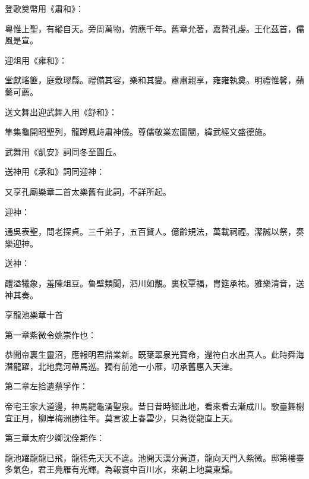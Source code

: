 \begin{pinyinscope}
 登歌奠幣用《肅和》：



 粵惟上聖，有縱自天。旁周萬物，俯應千年。舊章允著，嘉贄孔虔。王化茲首，儒風是宣。



 迎俎用《雍和》：



 堂獻瑤篚，庭敷璆縣。禮備其容，樂和其變。肅肅親享，雍雍執奠。明禮惟馨，蘋蘩可薦。



 送文舞出迎武舞入用《舒和》：



 隼集龜開昭聖列，龍蹲鳳歭肅神儀。尊儒敬業宏圖闡，緯武經文盛德施。



 武舞用《凱安》詞同冬至圓丘。



 送神用《承和》詞同迎神：



 又享孔廟樂章二首太樂舊有此詞，不詳所起。



 迎神：



 通吳表聖，問老探貞。三千弟子，五百賢人。億齡規法，萬載祠禋。潔誠以祭，奏樂迎神。



 送神：



 醴溢犧象，羞陳俎豆。魯壁類聞，泗川如覯。裏校覃福，胄筵承祐。雅樂清音，送神其奏。



 享龍池樂章十首



 第一章紫微令姚崇作也：



 恭聞帝裏生靈沼，應報明君鼎業新。既葉翠泉光寶命，還符白水出真人。此時舜海潛龍躍，北地堯河帶馬巡。獨有前池一小雁，叨承舊惠入天津。



 第二章左拾遺蔡孚作：



 帝宅王家大道邊，神馬龍龜湧聖泉。昔日昔時經此地，看來看去漸成川。歌臺舞榭宜正月，柳岸梅洲勝往年。莫言波上春雲少，只為從龍直上天。



 第三章太府少卿沈佺期作：



 龍池躍龍龍已飛，龍德先天天不違。池開天漢分黃道，龍向天門入紫微。邸第樓臺多氣色，君王鳧雁有光輝。為報寰中百川水，來朝上地莫東歸。




\end{pinyinscope}
